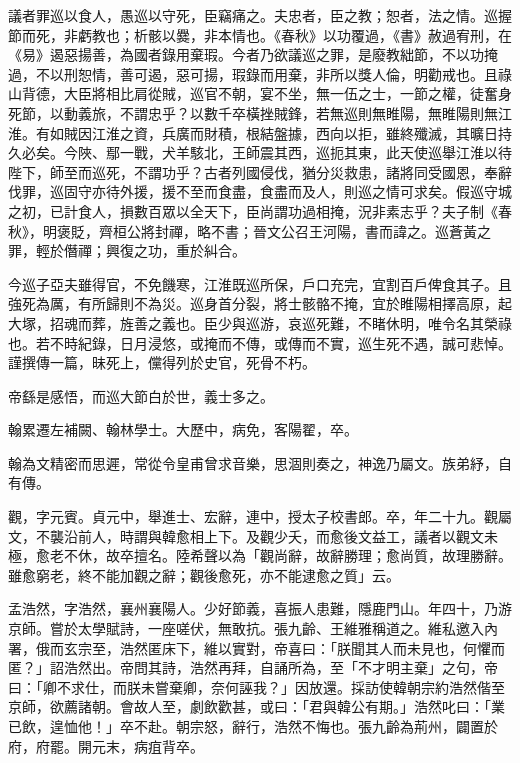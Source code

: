 \begin{pinyinscope}
 議者罪巡以食人，愚巡以守死，臣竊痛之。夫忠者，臣之教；恕者，法之情。巡握節而死，非虧教也；析骸以爨，非本情也。《春秋》以功覆過，《書》赦過宥刑，在《易》遏惡揚善，為國者錄用棄瑕。今者乃欲議巡之罪，是廢教絀節，不以功掩過，不以刑恕情，善可遏，惡可揚，瑕錄而用棄，非所以獎人倫，明勸戒也。且祿山背德，大臣將相比肩從賊，巡官不朝，宴不坐，無一伍之士，一節之權，徒奮身死節，以動義旅，不謂忠乎？以數千卒橫挫賊鋒，若無巡則無睢陽，無睢陽則無江淮。有如賊因江淮之資，兵廣而財積，根結盤據，西向以拒，雖終殲滅，其曠日持久必矣。今陜、鄢一戰，犬羊駭北，王師震其西，巡扼其東，此天使巡舉江淮以待陛下，師至而巡死，不謂功乎？古者列國侵伐，猶分災救患，諸將同受國恩，奉辭伐罪，巡固守亦待外援，援不至而食盡，食盡而及人，則巡之情可求矣。假巡守城之初，已計食人，損數百眾以全天下，臣尚謂功過相掩，況非素志乎？夫子制《春秋》，明褒貶，齊桓公將封禪，略不書；晉文公召王河陽，書而諱之。巡蒼黃之罪，輕於僭禪；興復之功，重於糾合。



 今巡子亞夫雖得官，不免饑寒，江淮既巡所保，戶口充完，宜割百戶俾食其子。且強死為厲，有所歸則不為災。巡身首分裂，將士骸骼不掩，宜於睢陽相擇高原，起大塚，招魂而葬，旌善之義也。臣少與巡游，哀巡死難，不睹休明，唯令名其榮祿也。若不時紀錄，日月浸悠，或掩而不傳，或傳而不實，巡生死不遇，誠可悲悼。謹撰傳一篇，昧死上，儻得列於史官，死骨不朽。



 帝繇是感悟，而巡大節白於世，義士多之。



 翰累遷左補闕、翰林學士。大歷中，病免，客陽翟，卒。



 翰為文精密而思遲，常從令皇甫曾求音樂，思涸則奏之，神逸乃屬文。族弟紓，自有傳。



 觀，字元賓。貞元中，舉進士、宏辭，連中，授太子校書郎。卒，年二十九。觀屬文，不襲沿前人，時謂與韓愈相上下。及觀少夭，而愈後文益工，議者以觀文未極，愈老不休，故卒擅名。陸希聲以為「觀尚辭，故辭勝理；愈尚質，故理勝辭。雖愈窮老，終不能加觀之辭；觀後愈死，亦不能逮愈之質」云。



 孟浩然，字浩然，襄州襄陽人。少好節義，喜振人患難，隱鹿門山。年四十，乃游京師。嘗於太學賦詩，一座嗟伏，無敢抗。張九齡、王維雅稱道之。維私邀入內署，俄而玄宗至，浩然匿床下，維以實對，帝喜曰：「朕聞其人而未見也，何懼而匿？」詔浩然出。帝問其詩，浩然再拜，自誦所為，至「不才明主棄」之句，帝曰：「卿不求仕，而朕未嘗棄卿，奈何誣我？」因放還。採訪使韓朝宗約浩然偕至京師，欲薦諸朝。會故人至，劇飲歡甚，或曰：「君與韓公有期。」浩然叱曰：「業已飲，遑恤他！」卒不赴。朝宗怒，辭行，浩然不悔也。張九齡為荊州，闢置於府，府罷。開元末，病疽背卒。




\end{pinyinscope}
